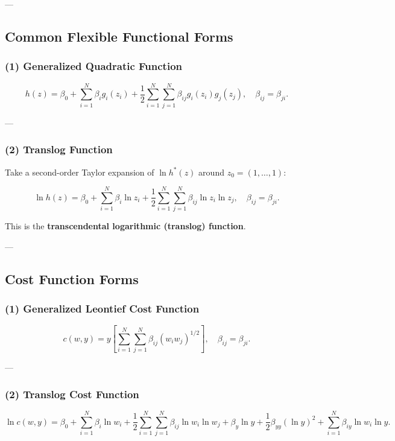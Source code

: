 ---

\subsection*{Common Flexible Functional Forms}

\subsubsection*{(1) Generalized Quadratic Function}

\[
h(z)
=
\beta_0
+
\sum_{i=1}^N \beta_i g_i(z_i)
+
\frac{1}{2}
\sum_{i=1}^N \sum_{j=1}^N
\beta_{ij} g_i(z_i) g_j(z_j),
\quad \beta_{ij} = \beta_{ji}.
\]

---

\subsubsection*{(2) Translog Function}

Take a second-order Taylor expansion of $\ln h^*(z)$ around
$z_0 = (1,\dots,1)$:

\[
\ln h(z)
=
\beta_0
+
\sum_{i=1}^N \beta_i \ln z_i
+
\frac{1}{2}
\sum_{i=1}^N \sum_{j=1}^N
\beta_{ij} \ln z_i \ln z_j,
\quad \beta_{ij} = \beta_{ji}.
\]

This is the \textbf{transcendental logarithmic (translog) function}.

---

\subsection*{Cost Function Forms}

\subsubsection*{(1) Generalized Leontief Cost Function}

\[
c(w,y)
=
y \left[
\sum_{i=1}^N \sum_{j=1}^N
\beta_{ij} (w_i w_j)^{1/2}
\right],
\quad \beta_{ij} = \beta_{ji}.
\]

---

\subsubsection*{(2) Translog Cost Function}

\[
\ln c(w,y)
=
\beta_0
+
\sum_{i=1}^N \beta_i \ln w_i
+
\frac{1}{2}
\sum_{i=1}^N \sum_{j=1}^N
\beta_{ij} \ln w_i \ln w_j
+
\beta_y \ln y
+
\frac{1}{2} \beta_{yy} (\ln y)^2
+
\sum_{i=1}^N \beta_{iy} \ln w_i \ln y.
\]

